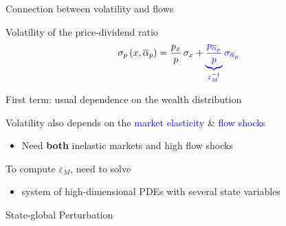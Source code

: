 \documentclass[12pt,aspectratio=169]{beamer}
\newenvironment{wideitemize}{\itemize\addtolength{\itemsep}{10pt}}{\enditemize}
\newcommand{\vspM}{\vspace{0.12truecm}}
\newenvironment{transitionframe}{
	\setbeamercolor{background canvas}{bg=mDarkBrown}
	\begin{frame}[plain, noframenumbering]}{
	\end{frame}
}
\begin{document}
\begin{frame}{Connection between volatility and flows}
    \begin{wideitemize}
        \item Volatility of the price-dividend ratio
        \[\sigma_{p}\left(x, \overline{\alpha}_{p}\right)=\frac{p_{x}}{p}\, \sigma_{x}+\textcolor{blue}{\underbrace{\frac{p_{\overline{\alpha}_{p}}}{p}}_{\varepsilon_M^{-1}}}\, \textcolor{blue}{\sigma_{\overline{\alpha}_{p}}}\]
        \item First term: usual dependence on the wealth distribution
        \item Volatility also depends on the \textcolor{blue}{market elasticity} \& \textcolor{blue}{flow shocks}\vspM
        \begin{itemize}
            \item Need \textbf{both} inelastic markets and high flow shocks%
        \end{itemize}
        \item To compute $\varepsilon_M$, need to solve\vspM%
        \begin{itemize}
            \item system of high-dimensional PDEs with several state variables 
        \end{itemize}
    \end{wideitemize}
\end{frame}

\begin{frame}[standout]
        State-global Perturbation
\end{frame}

\end{document}
